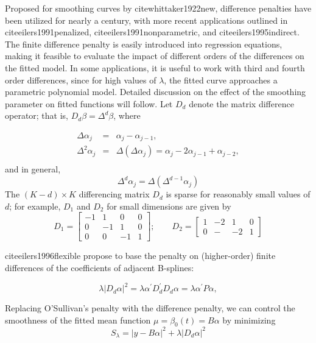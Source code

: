\documentclass[12pt]{article}
\theoremstyle{definition}
\begin{document}
Proposed for smoothing curves by cite{whittaker1922new}, difference penalties have been utilized for nearly a century, with more recent applications  outlined in  cite{eilers1991penalized}, cite{eilers1991nonparametric}, and cite{eilers1995indirect}. The finite difference penalty is easily introduced into regression equations, making it feasible to evaluate the impact of different orders of the differences on the fitted model. In some applications, it is useful to work with third and fourth order differences, since for high values of $\lambda$, the fitted curve approaches a parametric polynomial model. Detailed discussion on the effect of the smoothing parameter on fitted functions will follow. Let $D_d$ denote the matrix difference operator; that is, $D_d\beta = \Delta^d \beta$, where

 \begin{eqnarray*}
 \Delta \alpha_j &=& \alpha_j - \alpha_{j-1},\\
 \Delta^2 \alpha_j &=& \Delta\left(\Delta \alpha_j\right) = \alpha_j - 2\alpha_{j-1} + \alpha_{j-2},\\ 
 \end{eqnarray*}
\noindent 
and in general,
\begin{equation*}
\Delta^d \alpha_j = \Delta\left(\Delta^{d-1} \alpha_j \right)
\end{equation*}
The $\left(K - d\right) \times K$ differencing matrix $D_d$ is sparse for reasonably small values of $d$; for example, $D_1$ and $D_2$ for small dimensions are given by 
\[
D_1 = \begin{bmatrix} -1&1&0&0\\ 0&-1&1&0\\ 0&0&-1&1 \end{bmatrix}; \qquad D_2 = \begin{bmatrix} 1&-2&1&0 \\ 0&-&-2&1\end{bmatrix}
\]

cite{eilers1996flexible} propose to base the penalty on (higher-order) finite differences of the coefficients of adjacent B-splines:

 \[
 \lambda\vert D_d\alpha\vert^2 = \lambda \alpha^\prime D^\prime_d D_d \alpha = \lambda \alpha^\prime P\alpha,
 \] 



Replacing O'Sullivan's penalty with the difference penalty, we can control the smoothness of the fitted mean function $\mu = \beta_0\left( t \right) = B\alpha$ by minimizing
\begin{equation*} 
S_\lambda = \vert y- B \alpha \vert^2 + \lambda\vert D_d\alpha \vert^2
\end{equation*}
\end{document}
